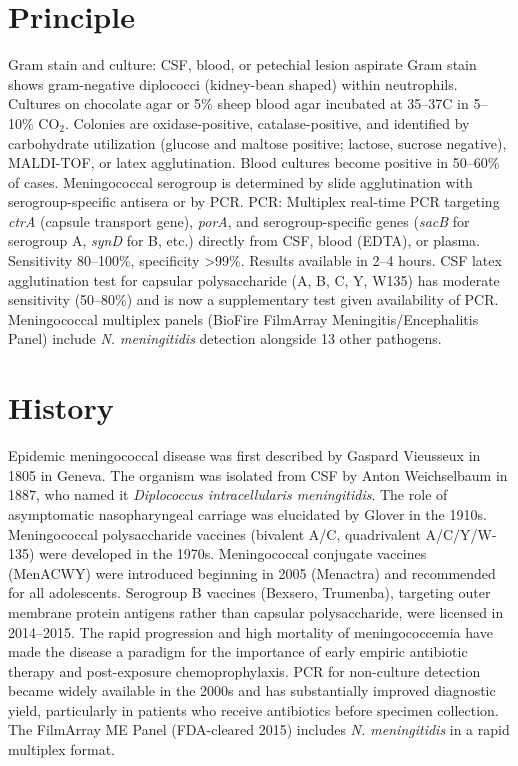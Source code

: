 \section*{Principle}
Gram stain and culture: CSF, blood, or petechial lesion aspirate Gram stain shows gram-negative diplococci (kidney-bean shaped) within neutrophils. Cultures on chocolate agar or 5\% sheep blood agar incubated at 35--37\textdegree{}C in 5--10\% CO$_2$. Colonies are oxidase-positive, catalase-positive, and identified by carbohydrate utilization (glucose and maltose positive; lactose, sucrose negative), MALDI-TOF, or latex agglutination. Blood cultures become positive in 50--60\% of cases. Meningococcal serogroup is determined by slide agglutination with serogroup-specific antisera or by PCR. PCR: Multiplex real-time PCR targeting \textit{ctrA} (capsule transport gene), \textit{porA}, and serogroup-specific genes (\textit{sacB} for serogroup A, \textit{synD} for B, etc.) directly from CSF, blood (EDTA), or plasma. Sensitivity 80--100\%, specificity >99\%. Results available in 2--4 hours. CSF latex agglutination test for capsular polysaccharide (A, B, C, Y, W135) has moderate sensitivity (50--80\%) and is now a supplementary test given availability of PCR. Meningococcal multiplex panels (BioFire FilmArray Meningitis/Encephalitis Panel) include \textit{N. meningitidis} detection alongside 13 other pathogens.

\section*{History}
Epidemic meningococcal disease was first described by Gaspard Vieusseux in 1805 in Geneva. The organism was isolated from CSF by Anton Weichselbaum in 1887, who named it \textit{Diplococcus intracellularis meningitidis}. The role of asymptomatic nasopharyngeal carriage was elucidated by Glover in the 1910s. Meningococcal polysaccharide vaccines (bivalent A/C, quadrivalent A/C/Y/W-135) were developed in the 1970s. Meningococcal conjugate vaccines (MenACWY) were introduced beginning in 2005 (Menactra) and recommended for all adolescents. Serogroup B vaccines (Bexsero, Trumenba), targeting outer membrane protein antigens rather than capsular polysaccharide, were licensed in 2014--2015. The rapid progression and high mortality of meningococcemia have made the disease a paradigm for the importance of early empiric antibiotic therapy and post-exposure chemoprophylaxis. PCR for non-culture detection became widely available in the 2000s and has substantially improved diagnostic yield, particularly in patients who receive antibiotics before specimen collection. The FilmArray ME Panel (FDA-cleared 2015) includes \textit{N. meningitidis} in a rapid multiplex format.

